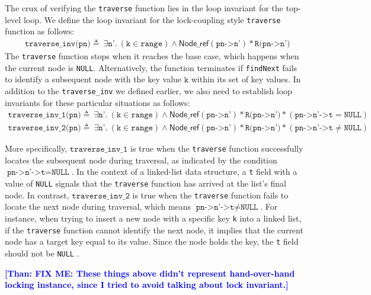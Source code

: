 \documentclass[a4paper,UKenglish,cleveref, autoref, thm-restate]{lipics-v2021}
\newcommand{\nodeboxrep}{\ensuremath{\mathsf{Node\_ref}}}
\newcommand{\than}[1]{\textbf{\textcolor{blue}{[Than: #1]}}}
\begin{document}
The crux of verifying the \texttt{traverse} function lies in the loop invariant for the top-level loop. We define the loop invariant for the lock-coupling style \texttt{traverse} function as follows:
\begin{align*} &\texttt{traverse\_inv(pn)} \triangleq\ \exists \texttt{n'}.\ (\texttt{k} \in \texttt{range})\land \nodeboxrep(\texttt{pn->n'})  \ast  \texttt{R(pn->n')}   
\end{align*}
The \lstinline{traverse} function stops when it reaches the base case, which happens when the current node is \lstinline{NULL}. Alternatively, the function terminates if \lstinline{findNext} fails to identify a subsequent node with the key value $\texttt{k}$ within its set of key values. In addition to the \texttt{traverse\_inv} we defined earlier, we also need to establish loop invariants for these particular situations as follows:
\begin{align*} 
	\texttt{traverse\_inv\_1(pn)} \triangleq\ \exists \texttt{n'}.\ (\texttt{k} \in \texttt{range})\land \nodeboxrep(\texttt{pn->n'})  \ast \texttt{R(pn->n')} \ast (\texttt{pn->n'->t} = \texttt{NULL})
	\\
	\texttt{traverse\_inv\_2(pn)} \triangleq\  \exists \texttt{n'}.\ (\texttt{k} \in \texttt{range})\land \nodeboxrep(\texttt{pn->n'})  \ast \texttt{R(pn->n')} \ast (\texttt{pn->n'->t} \neq \texttt{NULL})
\end{align*}

More specifically, $\texttt{traverse\_inv\_1}$ is true when the \lstinline{traverse} function successfully locates the subsequent node during traversal, as indicated by the condition $\texttt{pn->n'->t} = \texttt{NULL}$. In the context of a linked-list data structure, a \lstinline{t} field with a value of \lstinline{NULL} signals that the \lstinline{traverse} function has arrived at the list's final node. In contrast, $\texttt{traverse\_inv\_2}$ is true when the \lstinline{traverse} function fails to locate the next node during traversal, which means $\texttt{pn->n'->t} \neq \texttt{NULL}$. For instance, when trying to insert a new node with a specific key \lstinline{k} into a linked list, if the \lstinline{traverse} function cannot identify the next node, it implies that the current node has a target key equal to its value. Since the node holds the key, the \lstinline{t} field should not be \lstinline{NULL} .

\than{FIX ME: These things above didn't represent hand-over-hand locking instance, since I tried to avoid talking about lock invariant.}
\end{document}
